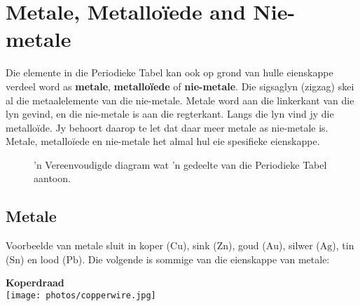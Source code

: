             \section{Metale, Metallo\"iede and Nie-metale}
            \nopagebreak
      \label{m38708*id65693}Die elemente in die Periodieke Tabel kan ook op grond van hulle eienskappe verdeel word as \textbf{metale}, \textbf{metallo\"iede} of \textbf{nie-metale}. Die sigsaglyn (zigzag) skei al die metaalelemente van die nie-metale. Metale word aan die linkerkant van die lyn gevind, en die nie-metale is aan die regterkant. Langs die lyn vind jy die metalloïde. Jy behoort daarop te let dat daar meer metale as nie-metale is. Metale, metalloïede en nie-metale het almal hul eie spesifieke eienskappe.\par 


\begin{figure}[h]

\begin{center}
\end{center}
\caption{ 'n Vereenvoudigde diagram wat  'n gedeelte van die Periodieke Tabel aantoon.}
\label{fig:periodic}
\end{figure} 
      \label{m38708*uid76}
            \subsection*{Metale}
            \nopagebreak
\begin{minipage}{.5\textwidth}
        \label{m38708*id65726}Voorbeelde van metale sluit in koper ($\text{Cu}$), sink ($\text{Zn}$), goud ($\text{Au}$), silwer ($\text{Ag}$), tin ($\text{Sn}$) en lood ($\text{Pb}$). Die volgende is sommige van die eienskappe van metale:\par 
\end{minipage}
\begin{minipage}{.5\textwidth}
\begin{center}
\textbf{Koperdraad}\\
 \texttt{[image: photos/copperwire.jpg]}
\end{center}
\end{minipage}

